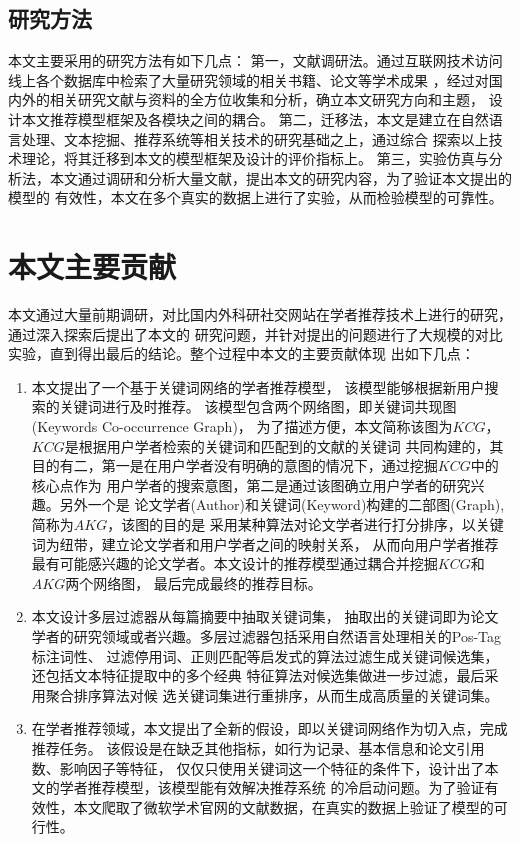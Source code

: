 \subsection{研究方法}
本文主要采用的研究方法有如下几点：
第一，文献调研法。通过互联网技术访问线上各个数据库中检索了大量研究领域的相关书籍、论文等学术成果%
，经过对国内外的相关研究文献与资料的全方位收集和分析，确立本文研究方向和主题，%
设计本文推荐模型框架及各模块之间的耦合。
第二，迁移法，本文是建立在自然语言处理、文本挖掘、推荐系统等相关技术的研究基础之上，通过综合%
探索以上技术理论，将其迁移到本文的模型框架及设计的评价指标上。
第三，实验仿真与分析法，本文通过调研和分析大量文献，提出本文的研究内容，为了验证本文提出的模型的%
有效性，本文在多个真实的数据上进行了实验，从而检验模型的可靠性。
\section{本文主要贡献}
本文通过大量前期调研，对比国内外科研社交网站在学者推荐技术上进行的研究，通过深入探索后提出了本文的%
研究问题，并针对提出的问题进行了大规模的对比实验，直到得出最后的结论。整个过程中本文的主要贡献体现%
出如下几点：
\begin{enumerate}
    \item 本文提出了一个基于关键词网络的学者推荐模型，%
          该模型能够根据新用户搜索的关键词进行及时推荐。%
          该模型包含两个网络图，即关键词共现图(Keywords Co-occurrence Graph)，%
          为了描述方便，本文简称该图为$KCG$，$KCG$是根据用户学者检索的关键词和匹配到的文献的关键词%
          共同构建的，其目的有二，第一是在用户学者没有明确的意图的情况下，通过挖掘$KCG$中的核心点作为%
          用户学者的搜索意图，第二是通过该图确立用户学者的研究兴趣。另外一个是
          论文学者(Author)和关键词(Keyword)构建的二部图(Graph),简称为$AKG$，该图的目的是%
          采用某种算法对论文学者进行打分排序，以关键词为纽带，建立论文学者和用户学者之间的映射关系，%
          从而向用户学者推荐最有可能感兴趣的论文学者。本文设计的推荐模型通过耦合并挖掘$KCG$和$AKG$两个网络图，%
          最后完成最终的推荐目标。
    \item 本文设计多层过滤器从每篇摘要中抽取关键词集，%
          抽取出的关键词即为论文学者的研究领域或者兴趣。多层过滤器包括采用自然语言处理相关的Pos-Tag标注词性、%
          过滤停用词、正则匹配等启发式的算法过滤生成关键词候选集，还包括文本特征提取中的多个经典%
          特征算法对候选集做进一步过滤，最后采用聚合排序算法对候%
          选关键词集进行重排序，从而生成高质量的关键词集。%
    \item 在学者推荐领域，本文提出了全新的假设，即以关键词网络作为切入点，完成推荐任务。%
          该假设是在缺乏其他指标，如行为记录、基本信息和论文引用数、影响因子等特征，%
          仅仅只使用关键词这一个特征的条件下，设计出了本文的学者推荐模型，该模型能有效解决推荐系统%
          的冷启动问题。为了验证有效性，本文爬取了微软学术官网的文献数据，在真实的数据上验证了模型的可行性。

\end{enumerate}




